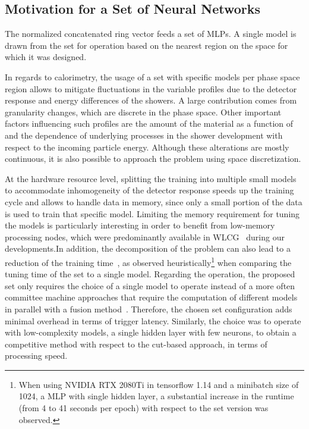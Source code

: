 \subsection{Motivation for a Set of Neural Networks}\label{ssec:nn_set}

The normalized concatenated ring vector feeds a set of MLPs. A single
model is drawn from the set for operation based on the nearest region on the \eteta space for which it was designed.

In regards to calorimetry, the usage of a set with specific models per phase space region allows to mitigate fluctuations in the variable profiles
due to the detector response and energy differences of the showers.
A large contribution comes from granularity changes, which are discrete
in the phase space. Other important factors 
influencing such profiles are the
amount of the material as a function of \abseta{} and the dependence of
underlying processes in the shower development with respect to the incoming
particle energy. Although these alterations are mostly continuous, it is also
possible to approach the problem using space discretization.



At the hardware resource level, splitting the training into multiple small models to accommodate inhomogeneity of the detector response speeds up the training cycle and allows to handle data in memory, since only a small portion of the data is used to train that specific model. Limiting the memory requirement for tuning the models is particularly interesting in order to benefit from low-memory processing nodes, which were predominantly available in 
WLCG~\cite{2015_lcg_tdr} during our developments.\@ In addition, the decomposition of the problem can also lead to a reduction of the training time~\cite{Polikar2006}, as observed heuristically\footnote{
  When using NVIDIA RTX 2080Ti in tensorflow 1.14 and a minibatch size of 1024, a MLP with single hidden layer, a substantial increase in the runtime (from 4 to 41 seconds per epoch) with respect to the set version was observed.} 
when comparing the tuning time of the set to a single model. 
Regarding the operation, the proposed set only requires the choice of a
single model to operate instead of a more often committee machine approaches
that require the computation of different models in parallel with a fusion
method~\cite{zhou_ensemble}.  Therefore, the chosen set configuration adds
minimal overhead in terms of trigger latency. Similarly, the choice was to
operate with low-complexity models, a single hidden layer with few neurons, to obtain a competitive method with respect to the cut-based approach, in terms of processing speed.



